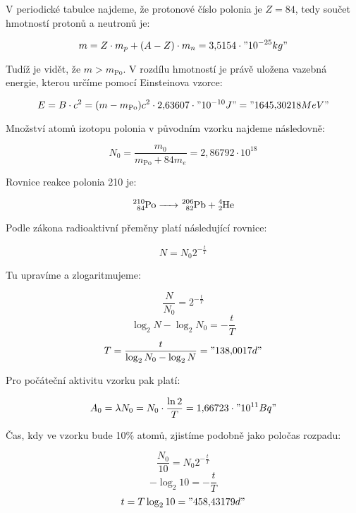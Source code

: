 \documentclass{fkssolpub}
\author{Ondřej Sedláček}
\begin{document}
V periodické tabulce najdeme, že protonové číslo polonia je $Z = 84$, tedy součet hmotností protonů a neutronů je:

\[
	m = Z \cdot m_p + (A - Z) \cdot m_n = 3{,}5154 \cdot "10^{-25} kg"
\]

Tudíž je vidět, že $m > m_{\text{Po}}$. V rozdílu hmotností je právě uložena vazebná energie, kterou určíme pomocí Einsteinova vzorce:

\[
	E = B \cdot c^2 = (m - m_{\text{Po}}) c^2 \cdot 2{,}63607 \cdot "10^{-10} J" = "1645{,}30218 MeV"
\]

Množství atomů izotopu polonia v původním vzorku najdeme následovně:

\[
	N_0 = \frac{m_0}{m_{\text{Po}} + 84m_e} = 2{,}86792 \cdot 10^{18}
\]

Rovnice reakce polonia 210 je:

\[
	\ce{^{210}_{84}Po -> ^{206}_{82}Pb + ^4_2He}
\]

Podle zákona radioaktivní přeměny platí následující rovnice:

\[
	N = N_0 2^{-\frac{t}{T}}
\]

Tu upravíme a zlogaritmujeme:

\[
	\frac{N}{N_0} = 2^{-\frac{t}{T}}
\]
\[
	\log_2 N - \log_2 N_0 = - \frac{t}{T}
\]
\[
	T = \frac{t}{\log_2 N_0 - \log_2 N} = "138{,}0017 d"
\]

Pro počáteční aktivitu vzorku pak platí:

\[
	A_0 = \lambda N_0 = N_0 \cdot \frac{\ln 2}{T} = 1{,}66723 \cdot "10^{11} Bq"
\]

Čas, kdy ve vzorku bude 10\% atomů, zjistíme podobně jako poločas rozpadu:

\[
	\frac{N_0}{10} = N_0 2^{-\frac{t}{T}}
\]
\[
	- \log_2 10 = - \frac{t}{T}
\]
\[
	t = T \log_2 10 = "458{,}43179 d"
\]
\end{document}
